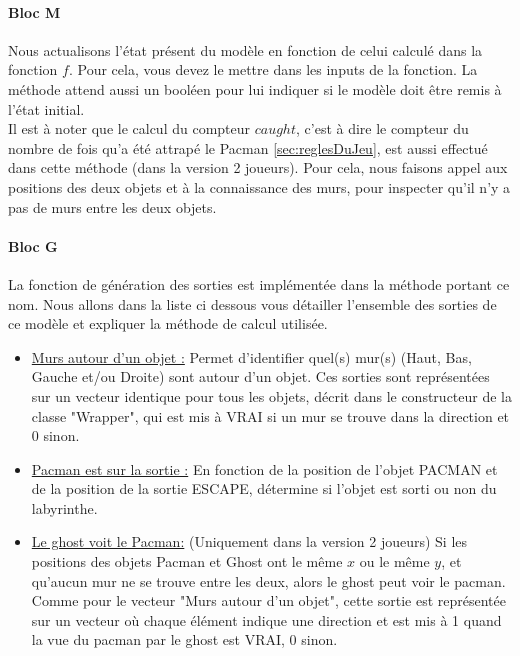 \paragraph*{Bloc M}
Nous actualisons l'état présent du modèle en fonction de celui calculé dans la fonction $f$. Pour cela, vous devez le mettre dans les inputs de la fonction. La méthode attend aussi un booléen pour lui indiquer si le modèle doit être remis à l'état initial.\\

Il est à noter que le calcul du compteur $caught$, c'est à dire le compteur du nombre de fois qu'a été attrapé le Pacman \ref{sec:reglesDuJeu}, est aussi effectué dans cette méthode (dans la version 2 joueurs). Pour cela, nous faisons appel aux positions des deux objets et à la connaissance des murs, pour inspecter qu'il n'y a pas de murs entre les deux objets.


\paragraph*{Bloc G} La fonction de génération des sorties est implémentée dans la méthode portant ce nom. Nous allons dans la liste ci dessous vous détailler l'ensemble des sorties de ce modèle et expliquer la méthode de calcul utilisée.  \begin{itemize}
\item [\textbullet] \underline{Murs autour d'un objet :} Permet d'identifier quel(s) mur(s) (Haut, Bas, Gauche et/ou Droite) sont autour d'un objet. Ces sorties sont représentées sur un vecteur identique pour tous les objets, décrit dans le constructeur de la classe "Wrapper", qui est mis à VRAI si un mur se trouve dans la direction et 0 sinon.
\item [\textbullet] \underline{Pacman est sur la sortie :} En fonction de la position de l'objet PACMAN et de la position de la sortie ESCAPE, détermine si l'objet est sorti ou non du labyrinthe.
\item [\textbullet] \underline{Le ghost voit le Pacman:} (Uniquement dans la version 2 joueurs) Si les positions des objets Pacman et Ghost ont le même $x$ ou le même $y$, et qu'aucun mur ne se trouve entre les deux, alors le ghost peut voir le pacman. Comme pour le vecteur "Murs autour d'un objet", cette sortie est représentée sur un vecteur où chaque élément indique une direction et est mis à 1 quand la vue du pacman par le ghost est VRAI, 0 sinon.
\end{itemize}

